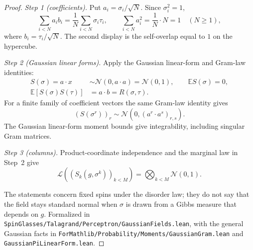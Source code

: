 \begin{proof}
  \leanok
\emph{Step 1 (coefficients).} Put $a_i=\sigma_i/\sqrt N$. Since $\sigma_i^2=1$,
\[
\sum_{i<N}a_ib_i=\frac1N\sum_{i<N}\sigma_i\tau_i,\qquad \sum_{i<N}a_i^2=\frac1N\cdot N=1\quad(N\ge1),
\]
where $b_i=\tau_i/\sqrt N$. The second display is the self-overlap equal to $1$ on the hypercube.

\emph{Step 2 (Gaussian linear forms).} Apply the Gaussian linear-form and Gram-law identities:
\begin{align*}
 S(\sigma)=a\cdot x&\sim\mathcal N(0,a\cdot a)=\mathcal N(0,1),\qquad \mathbb E S(\sigma)=0,\\
 \mathbb E[S(\sigma)S(\tau)]&=a\cdot b=R(\sigma,\tau).
\end{align*}
For a finite family of coefficient vectors the same Gram-law identity gives
\[
 (S(\sigma^r))_r\sim\mathcal N\!\left(0,(a^r\cdot a^s)_{r,s}\right).
\]
The Gaussian linear-form moment bounds give integrability, including singular Gram matrices.

\emph{Step 3 (columns).} Product-coordinate independence and the marginal law in Step~2 give
\[
 \mathcal L\!\left((S_k(g,\sigma^k))_{k<M}\right)
 =\bigotimes_{k<M}\mathcal N(0,1).
\]

The statements concern fixed spins under the disorder law; they do not say that the field stays standard normal
when $\sigma$ is drawn from a Gibbs measure that depends on $g$.
Formalized in \texttt{SpinGlasses/Talagrand/Perceptron/GaussianFields.lean}, with the general Gaussian
facts in \texttt{ForMathlib/Probability/Moments/GaussianGram.lean} and
\texttt{GaussianPiLinearForm.lean}.
\end{proof}

